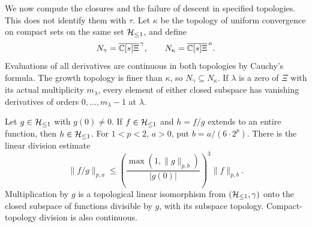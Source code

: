 We now compute the closures and the failure of descent in specified
topologies. This does not identify them with $\tau$.
Let $\kappa$ be the topology of uniform convergence on compact sets
on the same set $\mathcal H_{\leq 1}$, and define
\[
 N_\gamma=\overline{\mathbb C[s]\Xi}^{\,\gamma},\qquad
 N_\kappa=\overline{\mathbb C[s]\Xi}^{\,\kappa}.
\]
Evaluations of all derivatives are continuous in both topologies by
Cauchy's formula. The growth topology is finer than $\kappa$, so
$N_\gamma\subseteq N_\kappa$.
If $\lambda$ is a zero of $\Xi$ with its actual multiplicity $m_\lambda$,
every element of either closed subspace has vanishing derivatives
of orders $0,\ldots,m_\lambda-1$ at $\lambda$.

\begin{cqlemma}
\label{csq:thm-division}
Let $g\in\mathcal H_{\leq 1}$ with $g(0)\ne0$. If $f\in\mathcal H_{\leq 1}$ and $h=f/g$
extends to an entire function, then $h\in\mathcal H_{\leq 1}$. For $1<p<2$,
$a>0$, put $b=a/(6\cdot2^p)$. There is the linear division estimate
\begin{equation}\label{csq:eq-division-bound}
 \|f/g\|_{p,a}\leq
 \left(\frac{\max(1,\|g\|_{p,b})}{|g(0)|}\right)^3
 \|f\|_{p,b}.
\end{equation}
Multiplication by $g$ is a topological linear isomorphism from
$(\mathcal H_{\leq 1},\gamma)$ onto the closed subspace of functions divisible by
$g$, with its subspace topology. Compact-topology division is also
continuous.
\end{cqlemma}
